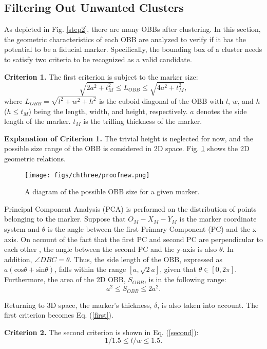 \subsection{Filtering Out Unwanted Clusters} 
As depicted in Fig. \ref{step2}, there are many OBBs after clustering. In this section, the geometric characteristics of each OBB are analyzed to verify if it has the potential to be a fiducial marker. Specifically, the bounding box of a cluster needs to satisfy two criteria to be recognized as a valid candidate. \par
%
\noindent\textbf{Criterion 1.} The first criterion is subject to the marker size: 
\begin{equation}	
		\sqrt{2a^{2}+t_{M}^{2}}\leq L_{OBB} \leq \sqrt{4a^{2}+t_{M}^{2}},
		\label{first}
	\end{equation} 
where $L_{OBB}=\sqrt{l^{2}+w^{2}+h^{2}}$ is the cuboid diagonal of the OBB with $l$, $w$, and $h$ ($h \leq t_{M}$) being the length, width, and height, respectively. $a$ denotes the side length of the marker. $t_{M}$ is the trifling thickness of the marker. \par
%
\noindent\textbf{Explanation of Criterion 1.} The trivial height is neglected for now, and the possible size range of the OBB is considered in 2D space. Fig. \ref{proof} shows the 2D geometric relations.
\begin{figure}[ht] 
	\centering
\texttt{[image: figs/chthree/proofnew.png]}
	\caption{A diagram of the possible OBB size for a given marker.}
	\label{proof}
\end{figure} \par
Principal Component Analysis (PCA) is performed on the distribution of points belonging to the marker.
%
Suppose that $O_{M}-X_{M}-Y_{M}$ is the marker coordinate system and $\theta$ is the angle between the first Primary Component (PC) and the x-axis. On account of the fact that the first PC and second PC are perpendicular to each other \cite{bounding}, the angle between the second PC and the y-axis is also $\theta$. In addition, $\angle DBC=\theta$. Thus, the side length of the OBB, expressed as $a (\mathrm{cos}\theta +\mathrm{sin}\theta)$, falls within the range $[a, \sqrt{2}a]$, given that $\theta \in [0, 2\pi]$. Furthermore, the area of the 2D OBB, $S_{OBB}$, is in the following range:
	\begin{equation}	
		a^{2}\leq S_{OBB} \leq 2a^{2}.
		\label{range}
	\end{equation} \par
Returning to 3D space, the marker's thickness, $\delta$, is also taken into account. The first criterion becomes Eq. (\ref{first}).
\par
\noindent\textbf{Criterion 2.} The second criterion is shown in Eq. (\ref{second}): 
	\begin{equation}	
		 1/1.5 \leq l/w \leq 1.5.
		\label{second}
	\end{equation} \par

